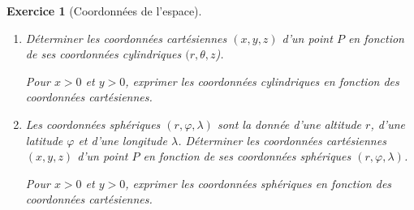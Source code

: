 \documentclass[11pt,a4paper]{article}
\theoremstyle{exostyle}
\newtheorem{exo}{Exercice}
\newcommand{\exercice}[1]{} \newcommand{\finexercice}{}
\newcommand{\enonce}{\begin{exo}} \newcommand{\finenonce}{\end{exo}}
\newcommand{\sauteligne}{\leavevmode\vspace{-\baselineskip}}
\begin{document}
\exercice{}

\enonce[Coordonnées de l'espace]
\sauteligne
\begin{enumerate}
	\item Déterminer les coordonnées cartésiennes $(x,y,z)$ d'un point $P$ en fonction de ses coordonnées cylindriques $(r,\theta,z$).
	
	Pour $x>0$ et $y>0$, exprimer les coordonnées cylindriques en fonction des coordonnées cartésiennes.
	
\begin{center}
\begin{minipage}{0.8\textwidth}	
  \center	
  
\end{minipage}  
\end{center}
	
	\item Les coordonnées sphériques $(r, \varphi, \lambda)$ sont la donnée d'une altitude $r$, d'une latitude $\varphi$ et d'une longitude $\lambda$.
	Déterminer les coordonnées cartésiennes $(x,y,z)$ d'un point $P$ en fonction de ses coordonnées sphériques $(r, \varphi, \lambda)$.
	
	Pour $x>0$ et $y>0$, exprimer les coordonnées sphériques en fonction des coordonnées cartésiennes.
	
\begin{center}
\begin{minipage}{0.8\textwidth}	
	\center
    
    ~	
	

\end{minipage}	
\end{center}	

\end{enumerate}
\finenonce
\end{document}

